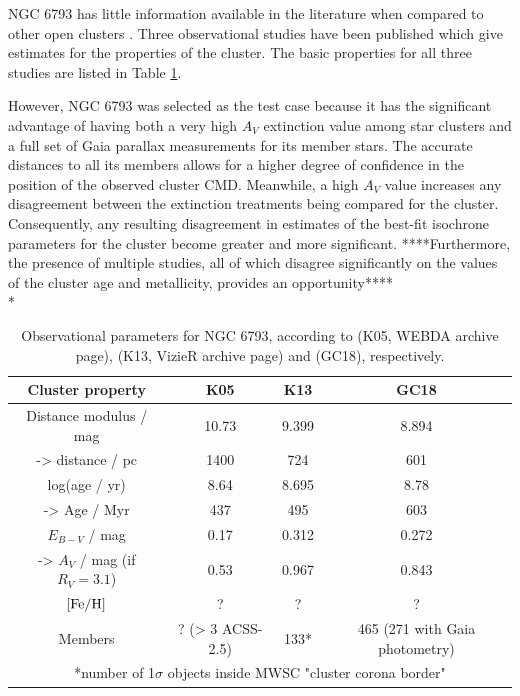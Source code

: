 \documentclass[12pt, a4paper]{report}
\begin{document}
NGC 6793 has little information available in the literature when compared to other open clusters \citep{2019A&A...623A.108B}. Three observational studies have been published which give estimates for the properties of the cluster. The basic properties for all three studies are listed in Table \ref{NGC6793_obs}.

However, NGC 6793 was selected as the test case because it has the significant advantage of having both a very high $A_{V}$ extinction value among star clusters and a full set of Gaia parallax measurements for its member stars. The accurate distances to all its members allows for a higher degree of confidence in the position of the observed cluster CMD. Meanwhile, a high $A_{V}$ value increases any disagreement between the extinction treatments being compared for the cluster. Consequently, any resulting disagreement in estimates of the best-fit isochrone parameters for the cluster become greater and more significant. ****Furthermore, the presence of multiple studies, all of which disagree significantly on the values of the cluster age and metallicity, provides an opportunity****  \\*

\begin{table}
\begin{center}
\begin{tabular}{cccc}
\hline
Cluster property & K05 & K13 & GC18 \\
\hline
Distance modulus / mag & 10.73 & 9.399 & 8.894 \\
-> distance / pc & 1400 & 724 & 601 \\
log(age / yr) & 8.64 & 8.695 & 8.78 \\
-> Age / Myr & 437 & 495 & 603 \\
$E_{B-V}$ / mag & 0.17 & 0.312 & 0.272 \\
-> $A_{V}$ / mag (if $R_{V} = 3.1$) & 0.53 & 0.967 & 0.843 \\
$\textnormal{[Fe/H]}$ & ? & ? & ? \\
Members & ? (> 3 ACSS-2.5) & 133* & 465 (271 with Gaia photometry) \\
\hline
\multicolumn{4}{c}{*number of 1$\sigma$ objects inside MWSC "cluster corona border"} \\
\end{tabular}
\caption{Observational parameters for NGC 6793, according to \cite{2005A&A...438.1163K} (K05, WEBDA archive page), \cite{2013A&A...558A..53K} (K13, VizieR archive page) and \cite{2018A&A...616A..10G} (GC18), respectively.}
\label{NGC6793_obs}
\end{center}
\end{table}
\end{document}
